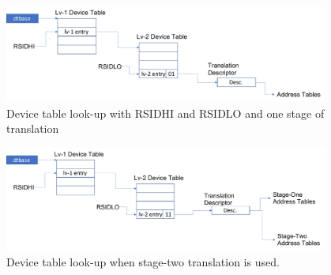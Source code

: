 \begin{figure}[h!t]
    \centering
    \includegraphics[width=0.95\textwidth]{img/dev_tbl_lookup_bare.pdf}
    \caption{Device table look-up with RSIDHI and RSIDLO and one stage of translation}
    \label{fig:dev_tbl_lookup_bare}
\end{figure}

\begin{figure}[h!t]
    \centering
    \includegraphics[width=0.95\textwidth]{img/dev_tbl_lookup_two_stage.pdf}
    \caption{Device table look-up when stage-two translation is used.}
    \label{fig:dev_tbl_lookup_two_stage}
\end{figure}

